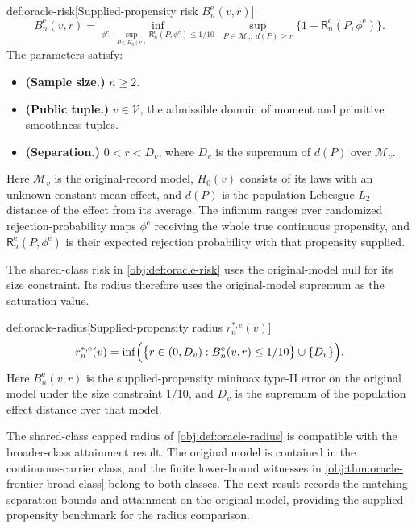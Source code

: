 \begin{definitionv}{def:oracle-risk}[Supplied-propensity risk $B_n^{\mathrm e}(v,r)$]
\[
B_n^{\mathrm e}(v,r)=
\inf_{\phi^{\mathrm e}:\ \sup_{P\in H_0(v)}
\mathsf R_n^{\mathrm e}(P,\phi^{\mathrm e})\le 1/10}
\ \sup_{P\in\mathcal M_v:\ d(P)\ge r}
\bigl\{1-\mathsf R_n^{\mathrm e}(P,\phi^{\mathrm e})\bigr\}.
\]
The parameters satisfy:
\begin{itemize}
\item \textbf{(Sample size.)} \(n\ge 2\).
\item \textbf{(Public tuple.)} \(v\in\mathcal V\), the admissible domain of moment and primitive smoothness tuples.
\item \textbf{(Separation.)} \(0<r<D_v\), where \(D_v\) is the supremum of \(d(P)\) over \(\mathcal M_v\).
\end{itemize}
Here \(\mathcal M_v\) is the original-record model, \(H_0(v)\) consists of its laws with an unknown constant mean effect, and \(d(P)\) is the population Lebesgue \(L_2\) distance of the effect from its average. The infimum ranges over randomized rejection-probability maps \(\phi^{\mathrm e}\) receiving the whole true continuous propensity, and \(\mathsf R_n^{\mathrm e}(P,\phi^{\mathrm e})\) is their expected rejection probability with that propensity supplied.
\end{definitionv}

The shared-class risk  in \cref{obj:def:oracle-risk} uses the original-model null for its size constraint. Its radius therefore uses the original-model supremum as the saturation value.

\begin{definitionv}{def:oracle-radius}[Supplied-propensity radius $r_n^{*,\mathrm e}(v)$]
\[
r_n^{*,\mathrm e}(v)=
\inf\Bigl(
\bigl\{r\in(0,D_v):B_n^{\mathrm e}(v,r)\le 1/10\bigr\}
\cup\{D_v\}
\Bigr).
\]
Here \(B_n^{\mathrm e}(v,r)\) is the supplied-propensity minimax type-II error on the original model under the size constraint \(1/10\), and \(D_v\) is the supremum of the population effect distance over that model.
\end{definitionv}

The shared-class capped radius  of \cref{obj:def:oracle-radius} is compatible with the broader-class attainment result. The original model is contained in the continuous-carrier class, and the finite lower-bound witnesses in \cref{obj:thm:oracle-frontier-broad-class} belong to both classes. The next result records the matching separation bounds and attainment on the original model, providing the supplied-propensity benchmark for the radius comparison.



